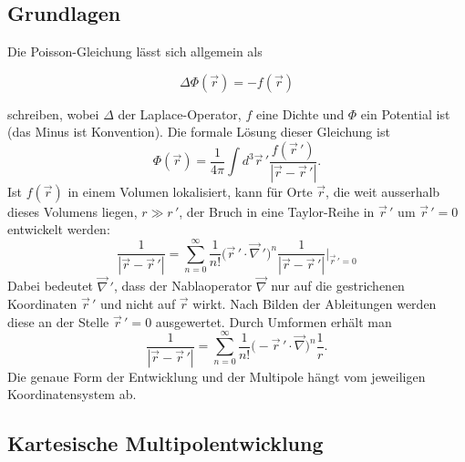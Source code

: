 \subsection{Grundlagen
\label{planet:subsection:grundlagen}}

Die Poisson-Gleichung lässt sich allgemein als

\begin{equation*}
\Delta \Phi (\vec{r}) = - f (\vec{r})
\end{equation*}

\noindent
schreiben, wobei \(\Delta\) der Laplace-Operator, \(f\) eine Dichte und \(\Phi\) ein Potential ist (das Minus ist Konvention).
Die formale Lösung dieser Gleichung ist
\begin{equation*}
\Phi (\vec{r})
=
\frac{1}{4\pi}
\int d^3 \vec{r}\,'
\frac{f (\vec{r}\,')}{|\vec{r} - \vec{r}\,'|}.
\end{equation*}
Ist \(f (\vec{r})\) in einem Volumen lokalisiert, kann für Orte
\(\vec{r}\), die weit ausserhalb dieses Volumens liegen, \(r \gg
r\,'\), der Bruch in eine Taylor-Reihe in \(\vec{r}\,'\) um
\(\vec{r}\,' = 0\) entwickelt werden:
\begin{equation*}
\frac{1}{|\vec{r} - \vec{r}\,'|}
=
\sum_{n=0}^{\infty}
\frac{1}{n!}
\bigl( \vec{r}\,' \cdot \vec{\nabla}\,' \bigr)^n
 \frac{1}{|\vec{r} - \vec{r}\,'|} \bigg|_{\vec{r}\,'=0}
\end{equation*}
Dabei bedeutet \(\vec{\nabla}\,'\), dass der Nablaoperator
\(\vec{\nabla}\) nur auf die gestrichenen Koordinaten \(\vec{r}\,'\)
und nicht auf \(\vec{r}\) wirkt.
Nach Bilden der Ableitungen werden diese an der Stelle \(\vec{r}\,' = 0\) ausgewertet.
Durch Umformen erhält man
\begin{equation*}
\frac{1}{|\vec{r} - \vec{r}\,'|}
=
\sum_{n=0}^{\infty}
\frac{1}{n!}
\bigl( - \vec{r}\,' \cdot \vec{\nabla} \bigr)^n
\frac{1}{r}.
\end{equation*}
Die genaue Form der Entwicklung und der Multipole hängt vom jeweiligen Koordinatensystem ab.

\subsection{Kartesische Multipolentwicklung
\label{planet:subsection:kartentwicklung}}

